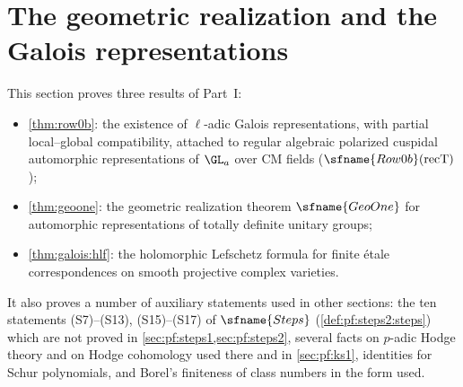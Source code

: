 \section{The geometric realization and the Galois representations}\label{sec:pf:geo}

\providecommand{\geoES}{\mathrm{ES}}
\providecommand{\geoJ}{\mathrm{J}}
\providecommand{\geoPhiK}{\Phi}
\providecommand{\geoW}{\mathrm{Wt}}
\providecommand{\geoRich}{\mathrm{Rich}}
\providecommand{\geoPar}{\mathrm{Par}}
\providecommand{\geoAbove}{\mathrm{Ab}}
\providecommand{\geotw}{\mathrm{tw}}
\providecommand{\geoHk}{P^{\mathrm{Hk}}}
\providecommand{\geort}{P^{\mathrm{rt}}}
\providecommand{\geounr}{P^{\mathrm{unr}}}
\providecommand{\geoHdg}[3]{H^{#3}\bigl(#1,\Omega^{#2}\bigr)}
\providecommand{\geoGU}{\mathrm{GU}}
\providecommand{\geoUa}{\Uni_a(\A_{E^+})}
\providecommand{\geoHO}{\mathrm{HO}}
\providecommand{\geoCong}{\mathcal{C}}
\providecommand{\geoGood}{\mathcal{G}}
\providecommand{\geoSat}{\mathrm{Sat}}
\providecommand{\geoWD}{\mathrm{WD}}

This section proves three results of Part~I:
\begin{itemize}[nosep]
\item \cref{thm:row0b}: the existence of $\ell$-adic Galois representations, with partial
  local--global compatibility, attached to regular algebraic polarized cuspidal automorphic
  representations of $\GL_a$ over CM fields ($\sfname{Row0b}(\mathrm{recT})$);
\item \cref{thm:geoone}: the geometric realization theorem $\sfname{GeoOne}$ for automorphic
  representations of totally definite unitary groups;
\item \cref{thm:galois:hlf}: the holomorphic Lefschetz formula for finite \'etale correspondences on
  smooth projective complex varieties.
\end{itemize}
It also proves a number of auxiliary statements used in other sections: the ten statements
(S7)--(S13), (S15)--(S17) of $\sfname{Steps}$ (\cref{def:pf:steps2:steps}) which are not proved in
\cref{sec:pf:steps1,sec:pf:steps2}, several facts on $p$-adic Hodge theory and on Hodge
cohomology used there and in \cref{sec:pf:ks1}, identities for Schur polynomials, and Borel's
finiteness of class numbers in the form used.

